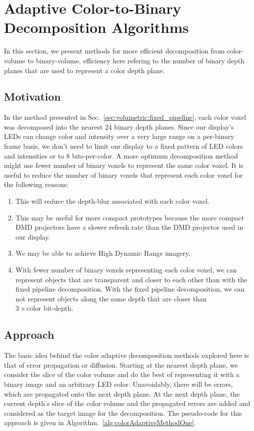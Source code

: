 \section{Adaptive Color-to-Binary Decomposition Algorithms}
\label{sec:volumetric:acd}

In this section, we present methods for more efficient decomposition from color-volume to binary-volume, efficiency here refering to the number of binary depth planes that are used to represent a color depth plane. 

\subsection{Motivation}
In the method presented in Sec.~\ref{sec:volumetric:fixed_pipeline}, each color voxel was decomposed into the nearest 24 binary depth planes. Since our display's LEDs can change color and intensity over a very large range on a per-binary frame basis, we don't need to limit our display to a fixed pattern of LED colors and intensities or to 8 bits-per-color. A more optimum decomposition method might use fewer number of binary voxels to represent the same color voxel. It is useful to reduce the number of binary voxels that represent each color voxel for the following reasons:

\begin{enumerate}
    \item This will reduce the depth-blur associated with each color voxel.
    \item This may be useful for more compact prototypes because the more compact DMD projectors have a slower refresh rate than the DMD projector used in our display.
    \item We may be able to achieve High Dynamic Range imagery.
    \item With fewer number of binary voxels representing each color voxel, we can represent objects that are transparent and closer to each other than with the fixed pipeline decomposition. With the fixed pipeline decomposition, we can not represent objects along the same depth that are closer than $3 \times \text{color bit-depth}$.
\end{enumerate}

\subsection{Approach}
The basic idea behind the color adaptive decomposition methods explored here is that of error propagation or diffusion. 
Starting at the nearest depth plane, we consider the slice of the color volume and do the best of representing it with a binary image and an arbitrary LED color. 
Unavoidably, there will be errors, which are propagated onto the next depth plane. 
At the next depth plane, the current depth's slice of the color volume and the propagated errors are added and considered as the target image for the decomposition.
The pseudo-code for this approach is given in Algorithm.~\ref{alg:colorAdaptiveMethodOne}.

